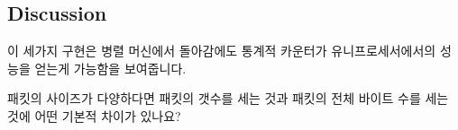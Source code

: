 \subsection{Discussion}

이 세가지 구현은 병렬 머신에서 돌아감에도 통계적 카운터가 유니프로세서에서의
성능을 얻는게 가능함을 보여줍니다.

\QuickQuiz{}
	패킷의 사이즈가 다양하다면 패킷의 갯수를 세는 것과 패킷의 전체 바이트
	수를 세는 것에 어떤 기본적 차이가 있나요?

